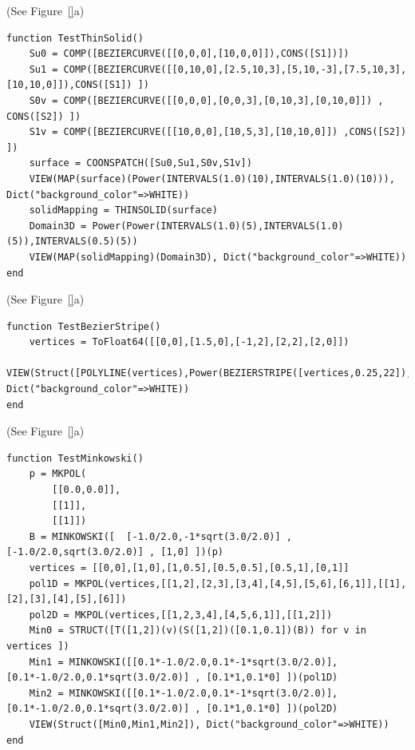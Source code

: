 \begin{coding}[Algebraic computation of FE = $\delta_1$]
\begin{condition}[(aaaaaaa] (See Figure~\ref{}a)\
\begin{lstlisting}[language=JuliaLocal, style=julia, mathescape=true]
function TestThinSolid()
	Su0 = COMP([BEZIERCURVE([[0,0,0],[10,0,0]]),CONS([S1])])
	Su1 = COMP([BEZIERCURVE([[0,10,0],[2.5,10,3],[5,10,-3],[7.5,10,3],[10,10,0]]),CONS([S1]) ])
	S0v = COMP([BEZIERCURVE([[0,0,0],[0,0,3],[0,10,3],[0,10,0]]) , CONS([S2]) ]) 
	S1v = COMP([BEZIERCURVE([[10,0,0],[10,5,3],[10,10,0]]) ,CONS([S2]) ])
	surface = COONSPATCH([Su0,Su1,S0v,S1v])
	VIEW(MAP(surface)(Power(INTERVALS(1.0)(10),INTERVALS(1.0)(10))), Dict("background_color"=>WHITE))
	solidMapping = THINSOLID(surface)
	Domain3D = Power(Power(INTERVALS(1.0)(5),INTERVALS(1.0)(5)),INTERVALS(0.5)(5))
	VIEW(MAP(solidMapping)(Domain3D), Dict("background_color"=>WHITE))
end
\end{lstlisting}
\end{condition}

\begin{condition}[(aaaaaaa] (See Figure~\ref{}a)\
\begin{lstlisting}[language=JuliaLocal, style=julia, mathescape=true]
function TestBezierStripe()
	vertices = ToFloat64([[0,0],[1.5,0],[-1,2],[2,2],[2,0]])
	VIEW(Struct([POLYLINE(vertices),Power(BEZIERSTRIPE([vertices,0.25,22]),QUOTE([0.9]))]), Dict("background_color"=>WHITE))
end
\end{lstlisting}
\end{condition}

\begin{condition}[(aaaaaaa] (See Figure~\ref{}a)\
\begin{lstlisting}[language=JuliaLocal, style=julia, mathescape=true]
function TestMinkowski()
	p = MKPOL(
		[[0.0,0.0]],
		[[1]],
		[[1]])
	B = MINKOWSKI([  [-1.0/2.0,-1*sqrt(3.0/2.0)] , [-1.0/2.0,sqrt(3.0/2.0)] , [1,0] ])(p)
	vertices = [[0,0],[1,0],[1,0.5],[0.5,0.5],[0.5,1],[0,1]]
	pol1D = MKPOL(vertices,[[1,2],[2,3],[3,4],[4,5],[5,6],[6,1]],[[1],[2],[3],[4],[5],[6]])
	pol2D = MKPOL(vertices,[[1,2,3,4],[4,5,6,1]],[[1,2]])
	Min0 = STRUCT([T([1,2])(v)(S([1,2])([0.1,0.1])(B)) for v in vertices ])
	Min1 = MINKOWSKI([[0.1*-1.0/2.0,0.1*-1*sqrt(3.0/2.0)],[0.1*-1.0/2.0,0.1*sqrt(3.0/2.0)] , [0.1*1,0.1*0] ])(pol1D)
	Min2 = MINKOWSKI([[0.1*-1.0/2.0,0.1*-1*sqrt(3.0/2.0)],[0.1*-1.0/2.0,0.1*sqrt(3.0/2.0)] , [0.1*1,0.1*0] ])(pol2D)
	VIEW(Struct([Min0,Min1,Min2]), Dict("background_color"=>WHITE))
end
\end{lstlisting}
\end{condition}


\end{coding}
